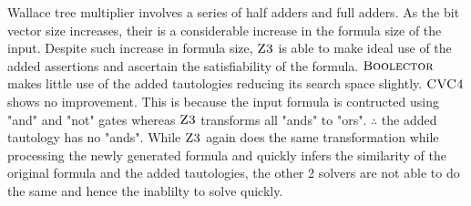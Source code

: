 Wallace tree multiplier involves a series of half adders and full adders. As the bit vector size increases, their is a considerable increase in the formula size of the input. Despite such increase in formula size, $\textsc{Z3}$ is able to make ideal use of the added assertions and ascertain the satisfiability of the formula. $\textsc{Boolector}$ makes little use of the added tautologies reducing its search space slightly. $\textsc{CVC4}$ shows no improvement. This is because the input formula is contructed using "and" and "not" gates whereas $\textsc{Z3}$ transforms all "ands" to "ors". $\therefore$ the added tautology has no "ands". While $\textsc{Z3}$ again does the same transformation while processing the newly generated formula and quickly infers the similarity of the original formula and the added tautologies, the other 2 solvers are not able to do the same and hence the inablilty to solve quickly.




